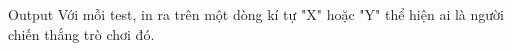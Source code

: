 Output
Với mỗi test, in ra trên một dòng kí tự "X" hoặc "Y" thể hiện ai là người chiến thắng trò chơi đó.